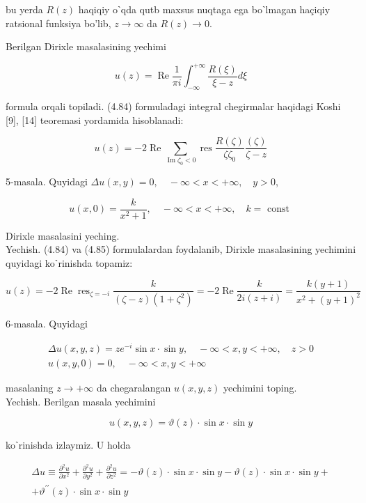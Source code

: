 \documentclass[10pt]{article}
\begin{document}
bu yerda $R(z)$ haqiqiy oˋqda qutb maxsus nuqtaga ega boˋlmagan haçiqiy ratsional funksiya bo'lib, $z \rightarrow \infty$ da $R(z) \rightarrow 0$.

Berilgan Dirixle masalasining yechimi


\begin{equation*}
u(z)=\operatorname{Re} \frac{1}{\pi i} \int_{-\infty}^{+\infty} \frac{R(\xi)}{\xi-z} d \xi \tag{4.84}
\end{equation*}


formula orqali topiladi. (4.84) formuladagi integral chegirmalar haqidagi Koshi [9], [14] teoremasi yordamida hisoblanadi:


\begin{equation*}
u(z)=-2 \operatorname{Re} \sum_{\operatorname{Im} \zeta_{0}<0} \operatorname{res} \frac{R(\zeta)}{\zeta \zeta_{0}} \frac{(\zeta)}{\zeta-z} \tag{4.85}
\end{equation*}


5-masala. Quyidagi $\Delta u(x, y)=0, \quad-\infty<x<+\infty, \quad y>0$,

$$
u(x, 0)=\frac{k}{x^{2}+1}, \quad-\infty<x<+\infty, \quad k=\text { const }
$$

Dirixle masalasini yeching.\\
Yechish. (4.84) va (4.85) formulalardan foydalanib, Dirixle masalasining yechimini quyidagi koˋrinishda topamiz:

$$
u(z)=-2 \operatorname{Re} \operatorname{res}_{\zeta=-i} \frac{k}{(\zeta-z)\left(1+\zeta^{2}\right)}=-2 \operatorname{Re} \frac{k}{2 i(z+i)}=\frac{k(y+1)}{x^{2}+(y+1)^{2}}
$$

6-masala. Quyidagi

$$
\begin{gathered}
\Delta u(x, y, z)=z e^{-i} \sin x \cdot \sin y, \quad-\infty<x, y<+\infty, \quad z>0 \\
u(x, y, 0)=0, \quad-\infty<x, y<+\infty
\end{gathered}
$$

masalaning $z \rightarrow+\infty$ da chegaralangan $u(x, y, z)$ yechimini toping.\\
Yechish. Berilgan masala yechimini

$$
u(x, y, z)=\vartheta(z) \cdot \sin x \cdot \sin y
$$

koˋrinishda izlaymiz. U holda

$$
\begin{gathered}
\Delta u \equiv \frac{\partial^{2} u}{\partial x^{2}}+\frac{\partial^{2} u}{\partial y^{2}}+\frac{\partial^{2} u}{\partial z^{2}}=-\vartheta(z) \cdot \sin x \cdot \sin y-\vartheta(z) \cdot \sin x \cdot \sin y+ \\
+\vartheta^{\prime \prime}(z) \cdot \sin x \cdot \sin y
\end{gathered}
$$
\end{document}
